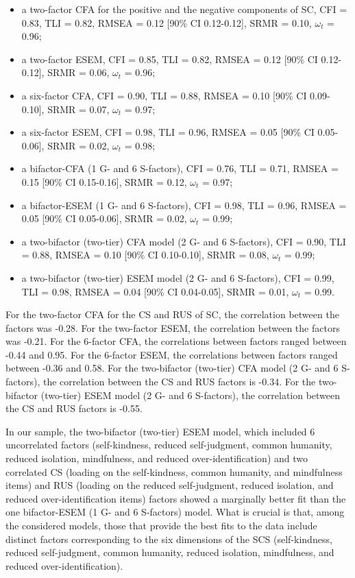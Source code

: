 \begin{appendix}
\begin{itemize}
\item
  a two-factor CFA for the positive and the negative components of SC,
  CFI = 0.83, TLI = 0.82, RMSEA = 0.12 {[}90\% CI 0.12-0.12{]}, SRMR =
  0.10, \(\omega_t\) = 0.96;
\item
  a two-factor ESEM, CFI = 0.85, TLI = 0.82, RMSEA = 0.12 {[}90\% CI
  0.12-0.12{]}, SRMR = 0.06, \(\omega_t\) = 0.96;
\item
  a six-factor CFA, CFI = 0.90, TLI = 0.88, RMSEA = 0.10 {[}90\% CI
  0.09-0.10{]}, SRMR = 0.07, \(\omega_t\) = 0.97;
\item
  a six-factor ESEM, CFI = 0.98, TLI = 0.96, RMSEA = 0.05 {[}90\% CI
  0.05-0.06{]}, SRMR = 0.02, \(\omega_t\) = 0.98;
\item
  a bifactor-CFA (1 G- and 6 S-factors), CFI = 0.76, TLI = 0.71, RMSEA =
  0.15 {[}90\% CI 0.15-0.16{]}, SRMR = 0.12, \(\omega_t\) = 0.97;
\item
  a bifactor-ESEM (1 G- and 6 S-factors), CFI = 0.98, TLI = 0.96, RMSEA
  = 0.05 {[}90\% CI 0.05-0.06{]}, SRMR = 0.02, \(\omega_t\) = 0.99;
\item
  a two-bifactor (two-tier) CFA model (2 G- and 6 S-factors), CFI =
  0.90, TLI = 0.88, RMSEA = 0.10 {[}90\% CI 0.10-0.10{]}, SRMR = 0.08,
  \(\omega_t\) = 0.99;
\item
  a two-bifactor (two-tier) ESEM model (2 G- and 6 S-factors), CFI =
  0.99, TLI = 0.98, RMSEA = 0.04 {[}90\% CI 0.04-0.05{]}, SRMR = 0.01,
  \(\omega_t\) = 0.99.
\end{itemize}

For the two-factor CFA for the CS and RUS of SC, the correlation between
the factors was -0.28. For the two-factor ESEM, the correlation between
the factors was -0.21. For the 6-factor CFA, the correlations between
factors ranged between -0.44 and 0.95. For the 6-factor ESEM, the
correlations between factors ranged between -0.36 and 0.58. For the
two-bifactor (two-tier) CFA model (2 G- and 6 S-factors), the
correlation between the CS and RUS factors is -0.34. For the
two-bifactor (two-tier) ESEM model (2 G- and 6 S-factors), the
correlation between the CS and RUS factors is -0.55.

In our sample, the two-bifactor (two-tier) ESEM model, which included 6
uncorrelated factors (self-kindness, reduced self-judgment, common
humanity, reduced isolation, mindfulness, and reduced
over-identification) and two correlated CS (loading on the
self-kindness, common humanity, and mindfulness items) and RUS (loading
on the reduced self-judgment, reduced isolation, and reduced
over-identification items) factors showed a marginally better fit than
the one bifactor-ESEM (1 G- and 6 S-factors) model. What is crucial is
that, among the considered models, those that provide the best fits to
the data include distinct factors corresponding to the six dimensions of
the SCS (self-kindness, reduced self-judgment, common humanity, reduced
isolation, mindfulness, and reduced over-identification).


\end{appendix}
